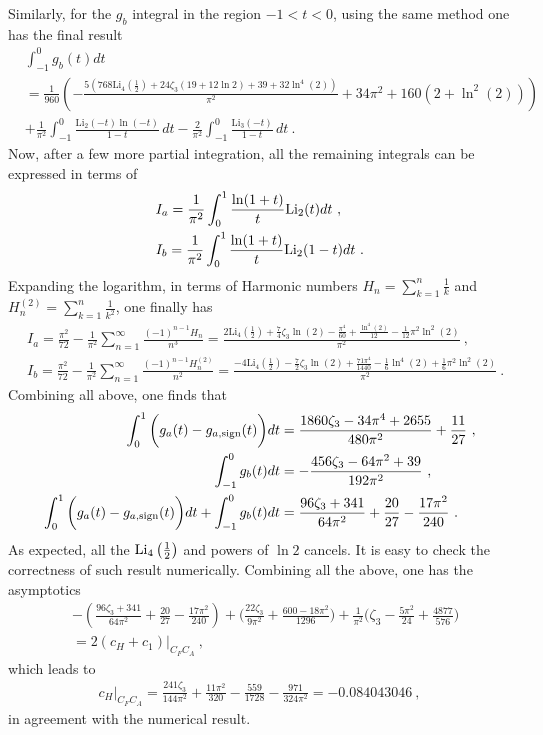 \documentclass[a4paper,11pt]{article}
\begin{document}
Similarly, for the $g_b$ integral in the region $-1<t<0$, using the same method one has the final result
\begin{align}
&\int_{-1}^{0} g_{b}(t)dt\nonumber \\ 
&=\frac{1}{960} \left(-\frac{5 \left(768 \text{Li}_4\left(\frac{1}{2}\right)+24 \zeta_3(19+12\ln2)+39+32 \ln^4(2)\right)}{\pi ^2}+34 \pi ^2+160 \left(2+\ln ^2(2)\right)\right) \nonumber \\ 
&+\frac{1}{\pi^2}\int_{-1}^0 \frac{\text{Li}_2(-t) \ln (-t)}{ 1-t} \, dt-\frac{2}{\pi^2}\int_{-1}^0 \frac{ \text{Li}_3(-t)}{ 1-t} \, dt \ .
\end{align}
Now,  after a few more partial integration, all the remaining integrals can be expressed in terms of
\begin{align}
&I_a=\frac{1}{\pi^2}\int_{0}^1 \frac{\ln(1+t)}{t}{\rm Li}_2(t) dt \ , \\ 
&I_b=\frac{1}{\pi^2}\int_{0}^1\frac{\ln(1+t)}{t}{\rm Li}_2(1-t) dt \ .
\end{align}
Expanding the logarithm, in terms of Harmonic numbers $H_n=\sum_{k=1}^n\frac{1}{k}$ and $H_n^{(2)}=\sum_{k=1}^{n}\frac{1}{k^2}$,  one finally has
\begin{align}
&I_a=\frac{\pi^2}{72}-\frac{1}{\pi^2}\sum_{n=1}^{\infty}\frac{(-1)^{n-1}H_n}{n^3}= \frac{2 \text{Li}_4\left(\frac{1}{2}\right)+\frac{7}{4} \zeta_3\ln (2)-\frac{\pi ^4}{60}+\frac{\ln ^4(2)}{12}-\frac{1}{12} \pi ^2 \ln ^2(2)}{\pi^2}\ , \\ 
&I_b=\frac{\pi^2}{72}-\frac{1}{\pi^2}\sum_{n=1}^{\infty}\frac{(-1)^{n-1}H_n^{(2)}}{n^2}=\frac{-4 \text{Li}_4\left(\frac{1}{2}\right)-\frac{7}{2} \zeta_3\ln (2)+\frac{71 \pi ^4}{1440}-\frac{1}{6} \ln ^4(2)+\frac{1}{6} \pi ^2 \ln ^2(2)}{\pi ^2} \ .
\end{align}
Combining all above, one finds that
\begin{align}
\int_{0}^1\bigg(g_a(t)-g_{a,{\rm sign}}(t)\bigg) dt&=\frac{1860 \zeta_3-34 \pi ^4+2655}{480 \pi ^2}+\frac{11}{27} \ , \\
\int_{-1}^{0} g_b(t) dt&=-\frac{456 \zeta_3-64 \pi ^2+39}{192 \pi ^2} \ , \\ 
\int_{0}^1\bigg(g_a(t)-g_{a,{\rm sign}}(t)\bigg) dt+\int_{-1}^{0} g_b(t) dt&=\frac{96 \zeta_3+341}{64 \pi ^2}+\frac{20}{27}-\frac{17 \pi ^2}{240} \ .
\end{align}
As expected, all the ${\rm Li}_4\left(\frac{1}{2}\right)$ and powers of $\ln 2$ cancels.  It is easy to check the correctness of such result numerically. Combining all the above, one has the asymptotics
\begin{align}
&-\left(\frac{96 \zeta_3+341}{64 \pi ^2}+\frac{20}{27}-\frac{17 \pi ^2}{240}\right)+\bigg(\frac{22 \zeta_3}{9 \pi ^2}+\frac{600-18 \pi ^2}{1296}\bigg)+\frac{1}{\pi^2}\bigg(\zeta_3-\frac{5\pi^2}{24} + \frac{4877}{576}\bigg) \nonumber \\ 
&=2(c_H+c_1)|_{C_FC_A} \ ,
\end{align}
which leads to
\begin{align}
c_H|_{C_FC_A}=\frac{241 \zeta_3}{144 \pi ^2}+\frac{11 \pi ^2}{320}-\frac{559}{1728}-\frac{971}{324 \pi ^2}=-0.084043046 \ ,
\end{align}
in agreement with the numerical result.
\end{document}
